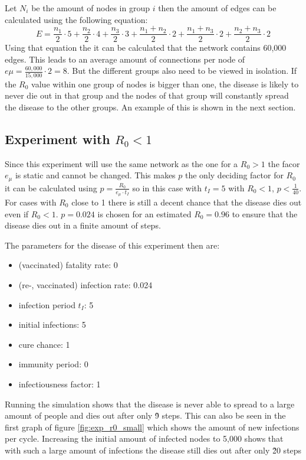 Let $N_i$ be the amount of nodes in group $i$
then the amount of edges can be calculated using the following equation:
\begin{equation}
    E = \frac{n_1}{2} \cdot 5 + \frac{n_2}{2} \cdot 4 + \frac{n_3}{2} \cdot 3 + \frac{n_1+n_2}{2} \cdot 2 + \frac{n_1+n_3}{2} \cdot 2 + \frac{n_2+n_3}{2} \cdot 2
\end{equation}
Using that equation the it can be calculated that the network contains 60,000 edges.
This leads to an average amount of connections per node of $e\mu=\frac{60,000}{15,000} \cdot 2 = 8$.
But the different groups also need to be viewed in isolation. If the $R_0$ value within
one group of nodes is bigger than one, the disease is likely to never die out in that group
and the nodes of that group will constantly spread the disease to the other groups.
An example of this is shown in the next section.

\subsection{Experiment with $R_0 < 1$}
Since this experiment will use the same network as the one for a $R_0 > 1$ the
facor $e_\mu$ is static and cannot be changed. This makes $p$ the only deciding
factor for $R_0$ it can be calculated using $p = \frac{R_0}{e_\mu \cdot t_I}$ so in this case with $t_I=5$
with $R_0 < 1$, $p < \frac{1}{40}$. For cases with $R_0$ close to 1 there is still
a decent chance that the disease dies out even if $R_0 < 1$. $p=0.024$
is chosen for an estimated $R_0=0.96$ to ensure that the disease dies out in a finite
amount of steps.

The parameters for the disease of this experiment then are:
\begin{itemize}
    \item (vaccinated) fatality rate: 0
    \item (re-, vaccinated) infection rate: 0.024
    \item infection period $t_I$: 5
    \item initial infections: 5
    \item cure chance: 1
    \item immunity period: 0
    \item infectiousness factor: 1
\end{itemize}

Running the simulation shows that the disease is never able to spread to a large
amount of people and dies out after only \~9 steps. This can also be seen in the first graph
of figure \ref{fig:exp_r0_small}
which shows the amount of new infections per cycle. 
Increasing the initial amount of infected nodes to 5,000 shows that with
such a large amount of infections the disease still dies out after only \~20 steps

